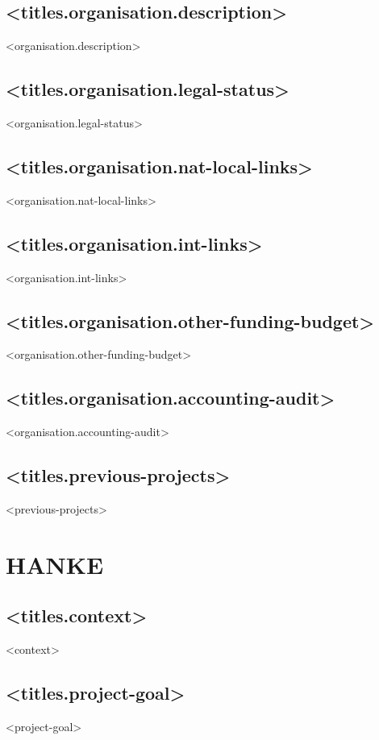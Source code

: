 \documentclass[twoside,a4paper]{article}
\begin{document}
		\subsection*{<titles.organisation.description>}
		    <organisation.description>
		
		\subsection*{<titles.organisation.legal-status>}
		    <organisation.legal-status>
		
		\subsection*{<titles.organisation.nat-local-links>}
		    <organisation.nat-local-links>
		
		\subsection*{<titles.organisation.int-links>}
		    <organisation.int-links>
		
		\subsection*{<titles.organisation.other-funding-budget>}
		    <organisation.other-funding-budget>
		
		\subsection*{<titles.organisation.accounting-audit>}
		    <organisation.accounting-audit>
		
		\subsection*{<titles.previous-projects>}
		    <previous-projects>
		
	\newpage		
	\section{HANKE}
		\subsection*{<titles.context>}
		    <context>

		\subsection*{<titles.project-goal>}
		    <project-goal>
		
\end{document}
